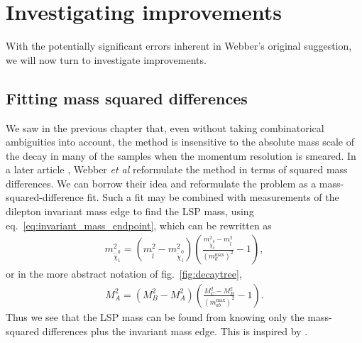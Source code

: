 \documentclass[twoside,english]{uiofysmaster}
\begin{document}
\chapter{Investigating improvements}%
\label{ch:investigating_improvements}
With the potentially significant errors inherent in Webber's original suggestion, we will now turn to investigate improvements.


\section{Fitting mass squared differences}
We saw in the previous chapter that, even without taking combinatorical ambiguities into account, the method is insensitive to the absolute mass scale of the decay in many of the samples when the momentum resolution is smeared. In a later article \cite{Nojiri:2010dk}, Webber {\it et al} reformulate the method in terms of squared mass differences. We can borrow their idea and reformulate the problem as a mass-squared-difference fit. Such a fit may be combined with measurements of the dilepton invariant mass edge to find the LSP mass, using eq.\ \eqref{eq:invariant_mass_endpoint}, which can be rewritten as
\begin{align}
	m^2_{\tilde\chi_1^0} = (m^2_{\tilde l} - m^2_{\tilde \chi_1^0})\left(\frac{m^2_{\tilde\chi_2^0} - m^2_{\tilde l}}{(m_{ll}^\mathrm{max})^2} - 1\right),
\end{align}
or in the more abstract notation of fig.\ \ref{fig:decaytree},
\begin{align}
	M^2_A = (M^2_B - M^2_A)\left(\frac{M^2_C - M^2_B}{(m_{ab}^\mathrm{max})^2} - 1\right).\label{eq:MLSP_dilepton_edge}
\end{align}
Thus we see that the LSP mass can be found from knowing only the mass-squared differences plus the invariant mass edge. This is inspired by \cite{Cheng:2009fw}.
\end{document}

